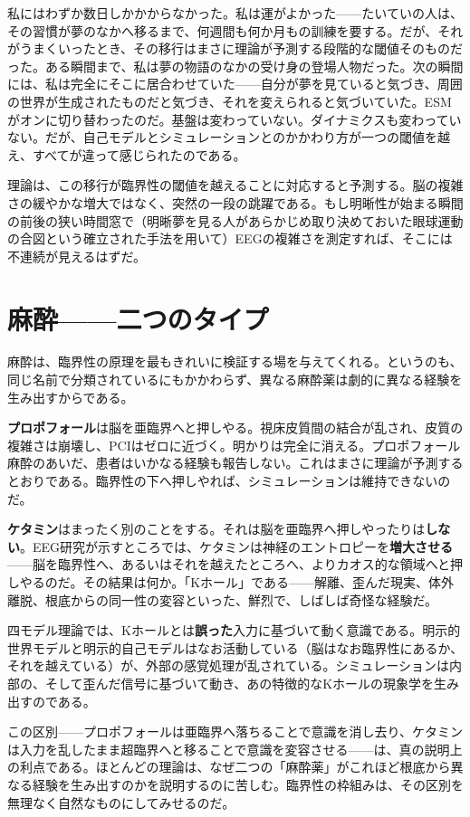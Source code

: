 \documentclass[11pt, twoside, openright]{book}
\begin{document}
私にはわずか数日しかかからなかった。私は運がよかった------たいていの人は、その習慣が夢のなかへ移るまで、何週間も何か月もの訓練を要する。だが、それがうまくいったとき、その移行はまさに理論が予測する段階的な閾値そのものだった。ある瞬間まで、私は夢の物語のなかの受け身の登場人物だった。次の瞬間には、私は完全にそこに居合わせていた------自分が夢を見ていると気づき、周囲の世界が生成されたものだと気づき、それを変えられると気づいていた。ESMがオンに切り替わったのだ。基盤は変わっていない。ダイナミクスも変わっていない。だが、自己モデルとシミュレーションとのかかわり方が一つの閾値を越え、すべてが違って感じられたのである。

理論は、この移行が臨界性の閾値を越えることに対応すると予測する。脳の複雑さの緩やかな増大ではなく、突然の一段の跳躍である。もし明晰性が始まる瞬間の前後の狭い時間窓で（明晰夢を見る人があらかじめ取り決めておいた眼球運動の合図という確立された手法を用いて）EEGの複雑さを測定すれば、そこには不連続が見えるはずだ。

\section*{麻酔------二つのタイプ}

麻酔は、臨界性の原理を最もきれいに検証する場を与えてくれる。というのも、同じ名前で分類されているにもかかわらず、異なる麻酔薬は劇的に異なる経験を生み出すからである。

\textbf{プロポフォール}は脳を亜臨界へと押しやる。視床皮質間の結合が乱され、皮質の複雑さは崩壊し、PCIはゼロに近づく。明かりは完全に消える。プロポフォール麻酔のあいだ、患者はいかなる経験も報告しない。これはまさに理論が予測するとおりである。臨界性の下へ押しやれば、シミュレーションは維持できないのだ。

\textbf{ケタミン}はまったく別のことをする。それは脳を亜臨界へ押しやったりは\textbf{しない}。EEG研究が示すところでは、ケタミンは神経のエントロピーを\textbf{増大させる}------脳を臨界性へ、あるいはそれを越えたところへ、よりカオス的な領域へと押しやるのだ。その結果は何か。「Kホール」である------解離、歪んだ現実、体外離脱、根底からの同一性の変容といった、鮮烈で、しばしば奇怪な経験だ。

四モデル理論では、Kホールとは\textbf{誤った}入力に基づいて動く意識である。明示的世界モデルと明示的自己モデルはなお活動している（脳はなお臨界性にあるか、それを越えている）が、外部の感覚処理が乱されている。シミュレーションは内部の、そして歪んだ信号に基づいて動き、あの特徴的なKホールの現象学を生み出すのである。

この区別------プロポフォールは亜臨界へ落ちることで意識を消し去り、ケタミンは入力を乱したまま超臨界へと移ることで意識を変容させる------は、真の説明上の利点である。ほとんどの理論は、なぜ二つの「麻酔薬」がこれほど根底から異なる経験を生み出すのかを説明するのに苦しむ。臨界性の枠組みは、その区別を無理なく自然なものにしてみせるのだ。
\end{document}

